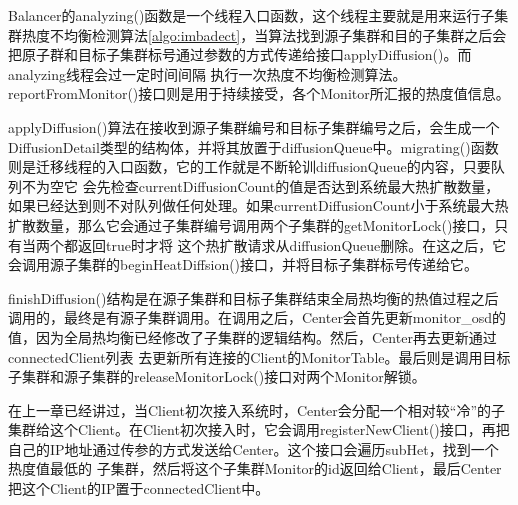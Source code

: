 Balancer的analyzing()函数是一个线程入口函数，这个线程主要就是用来运行子集群热度不均衡检测算法\ref{algo:imbadect}，当算法找到源子集群和目的子集群之后会把原子群和目标子集群标号通过参数的方式传递给接口applyDiffusion()。而analyzing线程会过一定时间间隔
执行一次热度不均衡检测算法。reportFromMonitor()接口则是用于持续接受，各个Monitor所汇报的热度值信息。

applyDiffusion()算法在接收到源子集群编号和目标子集群编号之后，会生成一个DiffusionDetail类型的结构体，并将其放置于diffusionQueue中。migrating()函数则是迁移线程的入口函数，它的工作就是不断轮训diffusionQueue的内容，只要队列不为空它
会先检查currentDiffusionCount的值是否达到系统最大热扩散数量，如果已经达到则不对队列做任何处理。如果currentDiffusionCount小于系统最大热扩散数量，那么它会通过子集群编号调用两个子集群的getMonitorLock()接口，只有当两个都返回true时才将
这个热扩散请求从diffusionQueue删除。在这之后，它会调用源子集群的beginHeatDiffsion()接口，并将目标子集群标号传递给它。

finishDiffusion()结构是在源子集群和目标子集群结束全局热均衡的热值过程之后调用的，最终是有源子集群调用。在调用之后，Center会首先更新monitor\_osd的值，因为全局热均衡已经修改了子集群的逻辑结构。然后，Center再去更新通过connectedClient列表
去更新所有连接的Client的MonitorTable。最后则是调用目标子集群和源子集群的releaseMonitorLock()接口对两个Monitor解锁。

在上一章已经讲过，当Client初次接入系统时，Center会分配一个相对较“冷”的子集群给这个Client。在Client初次接入时，它会调用registerNewClient()接口，再把自己的IP地址通过传参的方式发送给Center。这个接口会遍历subHet，找到一个热度值最低的
子集群，然后将这个子集群Monitor的id返回给Client，最后Center把这个Client的IP置于connectedClient中。